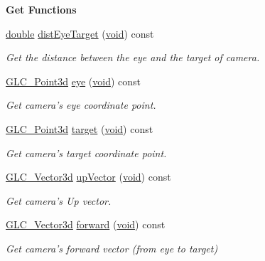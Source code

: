 \begin{Indent}{\bf Get Functions}\par
\begin{DoxyCompactItemize}
\item 
\hyperlink{_super_l_u_support_8h_a8956b2b9f49bf918deed98379d159ca7}{double} \hyperlink{class_g_l_c___camera_a425cd6e6095963f1b00a7168f94f81bb}{dist\-Eye\-Target} (\hyperlink{group___u_a_v_objects_plugin_ga444cf2ff3f0ecbe028adce838d373f5c}{void}) const 
\begin{DoxyCompactList}\small\item\em Get the distance between the eye and the target of camera. \end{DoxyCompactList}\item 
\hyperlink{glc__vector3d_8h_a4e13a9bbc7ab3d34de7e98b41836772c}{G\-L\-C\-\_\-\-Point3d} \hyperlink{class_g_l_c___camera_a5041bd562519848e77c863ee298bc16d}{eye} (\hyperlink{group___u_a_v_objects_plugin_ga444cf2ff3f0ecbe028adce838d373f5c}{void}) const 
\begin{DoxyCompactList}\small\item\em Get camera's eye coordinate point. \end{DoxyCompactList}\item 
\hyperlink{glc__vector3d_8h_a4e13a9bbc7ab3d34de7e98b41836772c}{G\-L\-C\-\_\-\-Point3d} \hyperlink{class_g_l_c___camera_a25d20f626be27230479931f0c73a5677}{target} (\hyperlink{group___u_a_v_objects_plugin_ga444cf2ff3f0ecbe028adce838d373f5c}{void}) const 
\begin{DoxyCompactList}\small\item\em Get camera's target coordinate point. \end{DoxyCompactList}\item 
\hyperlink{class_g_l_c___vector3d}{G\-L\-C\-\_\-\-Vector3d} \hyperlink{class_g_l_c___camera_a4f4adbb5b7268d216cf8bed418edb115}{up\-Vector} (\hyperlink{group___u_a_v_objects_plugin_ga444cf2ff3f0ecbe028adce838d373f5c}{void}) const 
\begin{DoxyCompactList}\small\item\em Get camera's Up vector. \end{DoxyCompactList}\item 
\hyperlink{class_g_l_c___vector3d}{G\-L\-C\-\_\-\-Vector3d} \hyperlink{class_g_l_c___camera_a87b31d1c53c32befaf4a284d7f913238}{forward} (\hyperlink{group___u_a_v_objects_plugin_ga444cf2ff3f0ecbe028adce838d373f5c}{void}) const 
\begin{DoxyCompactList}\small\item\em Get camera's forward vector (from eye to target) \end{DoxyCompactList}\item 

\end{DoxyCompactItemize}
\end{Indent}
